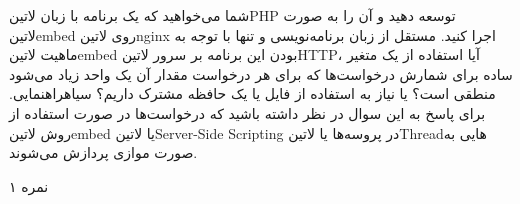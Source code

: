 \documentclass[../main.tex]{subfiles}
\begin{document}

شما می‌خواهید که یک برنامه با زبان ‌لاتین{PHP} توسعه دهید و آن را به صورت ‌لاتین{embed} روی ‌لاتین{nginx} اجرا کنید.
مستقل از زبان برنامه‌نویسی و تنها با توجه به ماهیت ‌لاتین{embed} بودن این برنامه بر سرور ‌لاتین{HTTP}، آیا استفاده از یک متغیر ساده برای شمارش درخواست‌ها
که برای هر درخواست مقدار آن یک واحد زیاد می‌شود منطقی است؟ یا نیاز به استفاده از فایل یا یک حافظه مشترک داریم؟
‌سیاه{راهنمایی.} برای پاسخ به این سوال در نظر داشته باشید که درخواست‌ها در صورت استفاده از روش ‌لاتین{embed} یا ‌لاتین{Server-Side Scripting}
در پروسه‌ها یا ‌لاتین{Thread}هایی به صورت موازی پردازش می‌شوند.

۱ نمره
\end{document}
